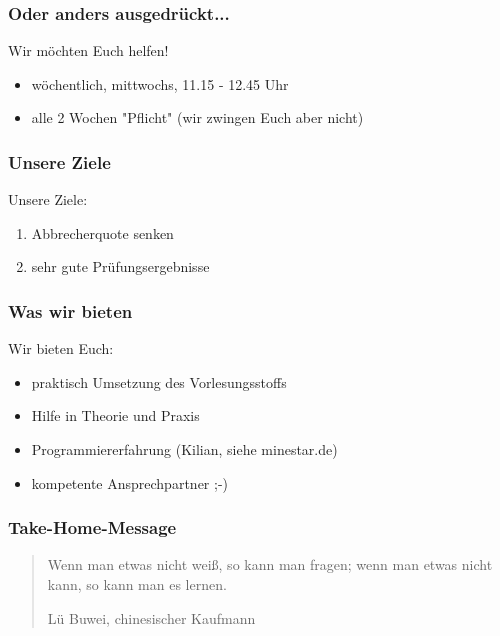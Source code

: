 \documentclass[12pt]{beamer}
\begin{document}
\begin{frame}

	\frametitle{Oder anders ausgedrückt...}

	\pause
	\begin{center}
		Wir möchten Euch helfen!
	\end{center}
	\pause

	\begin{itemize}
		\item wöchentlich, mittwochs, 11.15 - 12.45 Uhr
		\item alle 2 Wochen "Pflicht" (wir zwingen Euch aber nicht)
	\end{itemize}

\end{frame}

\begin{frame}

	\frametitle{Unsere Ziele}

	Unsere Ziele:
	\begin{enumerate}
		\item Abbrecherquote senken
		\item sehr gute Prüfungsergebnisse
	\end{enumerate}

\end{frame}

\begin{frame}
	\frametitle{Was wir bieten}

	Wir bieten Euch:
	\begin{itemize}
		\item praktisch Umsetzung des Vorlesungsstoffs
		\item Hilfe in Theorie und Praxis
		\item Programmiererfahrung (Kilian, siehe minestar.de)
		\item kompetente Ansprechpartner ;-)
	\end{itemize}
\end{frame}

\begin{frame}
	\frametitle{Take-Home-Message}
	\begin{quote}
		Wenn man etwas nicht weiß, so kann man fragen; wenn man etwas nicht
		kann, so kann man es lernen.
		\newline
		\begin{flushright}
		\scriptsize Lü Buwei, chinesischer Kaufmann
		\end{flushright}
	\end{quote}

\end{frame}
\end{document}
